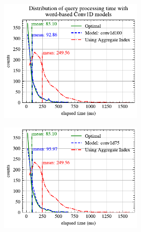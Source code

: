 \begin{figure}[!h]
	\centering
	\begin{subfigure}{0.45\textwidth}
		\begin{subfigure}{\textwidth}
			\centering
			\includegraphics[]{my/graphics/perf_dist_conv1d100_A.pdf}
		\end{subfigure}
		\vfill
		\begin{subfigure}{\textwidth}
			\centering
			\includegraphics[]{my/graphics/perf_dist_conv1d75_A.pdf}
		\end{subfigure}
		\vfill
		\begin{subfigure}{\textwidth}
			\centering

\end{subfigure}
\end{subfigure}
\end{figure}
